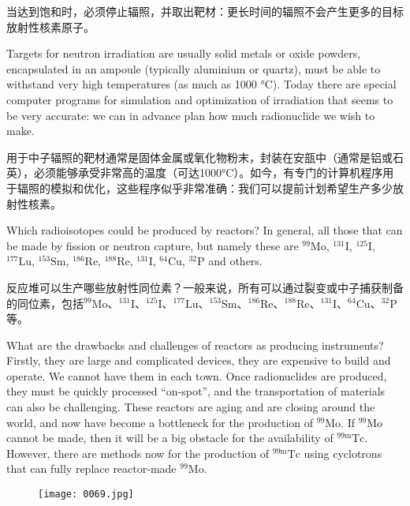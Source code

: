 \documentclass[dvipsnames, svgnames,a4paper,11pt]{article}
\begin{document}
当达到饱和时，必须停止辐照，并取出靶材：更长时间的辐照不会产生更多的目标放射性核素原子。

Targets for neutron irradiation are usually solid metals or oxide powders, encapsulated in an ampoule (typically aluminium or quartz), must be able to withstand very high temperatures (as much as 1000 °C). Today there are special computer programs for simulation and optimization of irradiation that seems to be very accurate: we can in advance plan how much radionuclide we wish to make.

用于中子辐照的靶材通常是固体金属或氧化物粉末，封装在安瓿中（通常是铝或石英），必须能够承受非常高的温度（可达1000°C）。如今，有专门的计算机程序用于辐照的模拟和优化，这些程序似乎非常准确：我们可以提前计划希望生产多少放射性核素。

Which radioisotopes could be produced by reactors? In general, all those that can be made by fission or neutron capture, but namely these are ${}^\text{99}\text{Mo}$, ${}^\text{131}\text{I}$, ${}^\text{125}\text{I}$, ${}^\text{177}\text{Lu}$, ${}^\text{153}\text{Sm}$, ${}^\text{186}\text{Re}$, ${}^\text{188}\text{Re}$, ${}^\text{131}\text{I}$, ${}^\text{64}\text{Cu}$, ${}^\text{32}\text{P}$ and others.

反应堆可以生产哪些放射性同位素？一般来说，所有可以通过裂变或中子捕获制备的同位素，包括${}^\text{99}\text{Mo}$、${}^\text{131}\text{I}$、${}^\text{125}\text{I}$、${}^\text{177}\text{Lu}$、${}^\text{153}\text{Sm}$、${}^\text{186}\text{Re}$、${}^\text{188}\text{Re}$、${}^\text{131}\text{I}$、${}^\text{64}\text{Cu}$、${}^\text{32}\text{P}$等。

What are the drawbacks and challenges of reactors as producing instruments? Firstly, they are large and complicated devices, they are expensive to build and operate. We cannot have them in each town. Once radionuclides are produced, they must be quickly processed “on-spot”, and the transportation of materials can also be challenging. These reactors are aging and are closing around the world, and now have become a bottleneck for the production of ${}^\text{99}\text{Mo}$. If ${}^\text{99}\text{Mo}$ cannot be made, then it will be a big obstacle for the availability of ${}^\text{99m}\text{Tc}$. However, there are methods now for the production of ${}^\text{99m}\text{Tc}$ using cyclotrons that can fully replace reactor-made ${}^\text{99}\text{Mo}$.

\begin{figure}[ht]
    \centering
    \texttt{[image: 0069.jpg]}
     \label{fig59}
    \end{figure}
    
\end{document}
